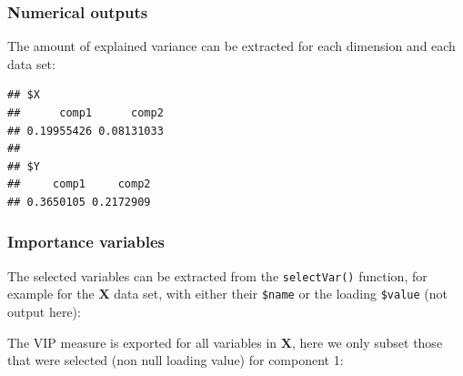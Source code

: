 \documentclass[
]{book}
\newenvironment{Shaded}{\begin{snugshade}}{\end{snugshade}}
\newcommand{\AttributeTok}[1]{\textcolor[rgb]{0.77,0.63,0.00}{#1}}
\newcommand{\CommentTok}[1]{\textcolor[rgb]{0.56,0.35,0.01}{\textit{#1}}}
\newcommand{\DecValTok}[1]{\textcolor[rgb]{0.00,0.00,0.81}{#1}}
\newcommand{\FunctionTok}[1]{\textcolor[rgb]{0.00,0.00,0.00}{#1}}
\newcommand{\NormalTok}[1]{#1}
\newcommand{\OtherTok}[1]{\textcolor[rgb]{0.56,0.35,0.01}{#1}}
\newcommand{\SpecialCharTok}[1]{\textcolor[rgb]{0.00,0.00,0.00}{#1}}
\begin{document}
\hypertarget{04:spls2-variance}{%
\subsubsection{Numerical outputs}\label{04:spls2-variance}}

The amount of explained variance can be extracted for each dimension and each data set:

\begin{Shaded}
\end{Shaded}

\begin{verbatim}
## $X
##      comp1      comp2 
## 0.19955426 0.08131033 
## 
## $Y
##     comp1     comp2 
## 0.3650105 0.2172909
\end{verbatim}

\hypertarget{04:spls2-variables}{%
\subsubsection{Importance variables}\label{04:spls2-variables}}

The selected variables can be extracted from the \texttt{selectVar()} function, for example for the \(\boldsymbol X\) data set, with either their \texttt{\$name} or the loading \texttt{\$value} (not output here):

\begin{Shaded}
\end{Shaded}

The VIP measure is exported for all variables in \(\boldsymbol X\), here we only subset those that were selected (non null loading value) for component 1:

\begin{Shaded}
\end{Shaded}
\end{document}

